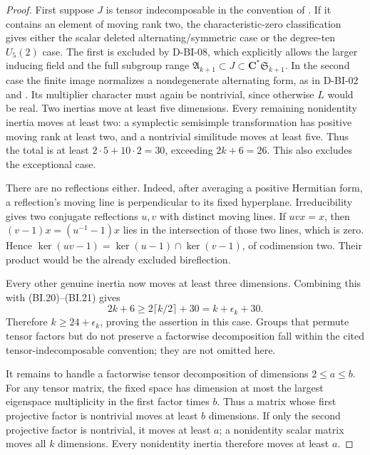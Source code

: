 \begin{proof}
First suppose $J$ is tensor indecomposable in the convention of
\cite[paragraph before Theorem~7.1]{BI:GS}.  If it contains an element
of moving rank two, the characteristic-zero classification
\cite[Theorem~7.1 and Remark~(3), pp.~548--549]{BI:GS} gives either
the scalar deleted alternating/symmetric case or the degree-ten
$U_5(2)$ case.  The first is excluded by D-BI-08, which explicitly
allows the larger inducing field and the full subgroup range
$\mathfrak A_{k+1}\subset J\subset\mathbf C^*\mathfrak S_{k+1}$.
In the second case the finite image normalizes a nondegenerate
alternating form, as in D-BI-02 and
\cite[Table~II]{BI:GT}.  Its multiplier character must again be
nontrivial, since otherwise $L$ would be real.  Two inertias move at
least five dimensions.  Every remaining nonidentity inertia moves
at least two: a symplectic semisimple transformation has positive
moving rank at least two, and a nontrivial similitude moves at least
five.  Thus the total is at least $2\cdot5+10\cdot2=30$, exceeding
$2k+6=26$.  This also excludes the exceptional case.

There are no reflections either.  Indeed, after averaging a positive
Hermitian form, a reflection's moving line is perpendicular to its
fixed hyperplane.  Irreducibility gives two conjugate reflections
$u,v$ with distinct moving lines.  If $uvx=x$, then
$(v-1)x=(u^{-1}-1)x$ lies in the intersection of those two lines,
which is zero.  Hence
$\ker(uv-1)=\ker(u-1)\cap\ker(v-1)$, of codimension two.
Their product would be the already excluded bireflection.

Every other genuine inertia now moves at least three dimensions.
Combining this with (BI.20)--(BI.21) gives
\[
              2k+6\ge 2\lceil k/2\rceil+30
                         =k+\epsilon_k+30.
                                                               \tag{BI.22}
\]
Therefore $k\ge24+\epsilon_k$, proving the assertion in this case.
Groups that permute tensor factors but do not preserve a factorwise
decomposition fall within the cited tensor-indecomposable convention;
they are not omitted here.

It remains to handle a factorwise tensor decomposition of dimensions
$2\le a\le b$.  For any tensor matrix, the fixed space has dimension
at most the largest eigenspace multiplicity in the first factor
times $b$.  Thus a matrix whose first projective factor is nontrivial
moves at least $b$ dimensions.  If only the second projective factor
is nontrivial, it moves at least $a$; a nonidentity scalar matrix
moves all $k$ dimensions.  Every nonidentity inertia therefore moves
at least $a$.


\end{proof}
